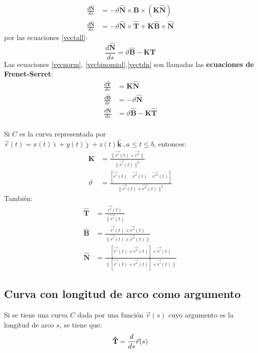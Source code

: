 \documentclass[a4paper]{article}
\newcommand{\ihat}{\boldsymbol{\hat{\imath}}}
\newcommand{\jhat}{\boldsymbol{\hat{\jmath}}}
\newcommand{\khat}{\boldsymbol{\hat{\bm{k}}}}
\begin{document}
\begin{align*}
\frac{d\mathbf{\hat{N}}}{ds}&=-\vartheta\mathbf{\hat{N}}\times\mathbf{\hat{B}}\times(\mathbf{K}\mathbf{\hat{N}})\\
\frac{d\mathbf{\hat{N}}}{ds}&=-\vartheta\mathbf{\hat{N}}\times\mathbf{\hat{T}}+\mathbf{K}\mathbf{\hat{B}}\times\mathbf{\hat{N}}
\end{align*}
por las ecuaciones \ref{vectall}:
\begin{equation}
\label{vectdn}
\frac{d\mathbf{\hat{N}}}{ds}=\vartheta\mathbf{\hat{B}}-\mathbf{K}\mathbf{\hat{T}}
\end{equation}
Las ecuaciones \ref{vecnorm}, \ref{vecbinomial},\ref{vectdn} son llamadas las \textbf{ecuaciones de Frenet-Serret}:
\begin{align*}
\frac{d\mathbf{\hat{T}}}{ds}&=\mathbf{K}\mathbf{\hat{N}}\\
\frac{d\mathbf{\hat{B}}}{ds}&=-\vartheta\mathbf{\hat{N}}\\
\frac{d\mathbf{\hat{N}}}{ds}&=\vartheta\mathbf{\hat{B}}-\mathbf{K}\mathbf{\hat{T}}
\end{align*}\\
Si $C$ es la curva representada por $\vec{r}(t)=x(t)\ihat+y(t)\jhat+z(t)\khat\ ,a\leq t\leq b$, entonces:
\begin{align*}
\mathbf{K}&=\frac{\lVert \vec{r'}(t)\times\vec{r''}\rVert}{\lVert \vec{r'}(t)\rVert^3}\\
\vartheta&=\frac{[\vec{r'}(t)\quad\vec{r''}(t)\quad\vec{r'''}(t)]}{\lVert \vec{r'}(t)\times\vec{r''}(t)\rVert^2}
\end{align*}
También:
\begin{align*}
\mathbf{\hat{T}}&=\frac{\vec{r'}(t)}{\lVert \vec{r'}(t)}\\
\mathbf{\hat{B}}&=\frac{\vec{r'}(t)\times\vec{r''}(t)}{\rVert \vec{r'}(t)\times\vec{r''}(t)\lVert}\\
\mathbf{\hat{N}}&=\frac{[\vec{r'}(t)\times\vec{r''}(t)]\times\vec{r'}(t)}{\lVert [\vec{r'}(t)\times\vec{r''}(t)]\times\vec{r'}(t)\rVert}
\end{align*}
\subsection{Curva con longitud de arco como argumento}
Si se tiene una curva $C$ dada por una función $\vec{r}(s)$ cuyo argumento es la longitud de arco $s$, se tiene que:
\[
\mathbf{\hat{T}}=\frac{d}{ds}\vec{r}(s)\\
\] 
\end{document}
